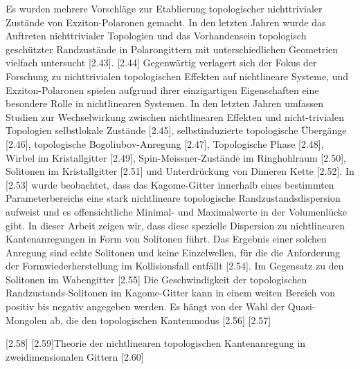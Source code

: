 \documentclass[
aps,
prl,
groupedaddress,
superscriptaddress,
floatfix,
notitlepage
]{revtex4-1}
\begin{document}
Es wurden mehrere Vorschläge zur Etablierung topologischer nichttrivialer Zustände von Exziton-Polaronen gemacht. In den letzten Jahren wurde das Auftreten nichttrivialer Topologien und das Vorhandensein topologisch geschützter Randzustände in Polarongittern mit unterschiedlichen Geometrien vielfach untersucht [2.43].
[2.44]
Gegenwärtig verlagert sich der Fokus der Forschung zu nichttrivialen topologischen Effekten auf nichtlineare Systeme, und Exziton-Polaronen spielen aufgrund ihrer einzigartigen Eigenschaften eine besondere Rolle in nichtlinearen Systemen. In den letzten Jahren umfassen Studien zur Wechselwirkung zwischen nichtlinearen Effekten und nicht-trivialen Topologien selbstlokale Zustände [2.45], selbstinduzierte topologische Übergänge [2.46], topologische Bogoliubov-Anregung [2.47],
Topologische Phase [2.48], Wirbel im Kristallgitter [2.49], Spin-Meissner-Zustände im Ringhohlraum [2.50], Solitonen im Kristallgitter [2.51] und Unterdrückung von Dimeren
Kette [2.52].
In [2.53] wurde beobachtet, dass das Kagome-Gitter innerhalb eines bestimmten Parameterbereichs eine stark nichtlineare topologische Randzustandsdispersion aufweist und es offensichtliche Minimal- und Maximalwerte in der Volumenlücke gibt. In dieser Arbeit zeigen wir, dass diese spezielle Dispersion zu nichtlinearen Kantenanregungen in Form von Solitonen führt. Das Ergebnis einer solchen Anregung sind echte Solitonen und keine Einzelwellen, für die die Anforderung der Formwiederherstellung im Kollisionsfall entfällt [2.54]. Im Gegensatz zu den Solitonen im Wabengitter [2.55]
Die Geschwindigkeit der topologischen Randzustands-Solitonen im Kagome-Gitter kann in einem weiten Bereich von positiv bis negativ angegeben werden.
Es hängt von der Wahl der Quasi-Mongolen ab, die den topologischen Kantenmodus
[2.56]
[2.57]

[2.58]
[2.59]{Theorie der nichtlinearen topologischen Kantenanregung in zweidimensionalen Gittern}
[2.60]
\end{document}
